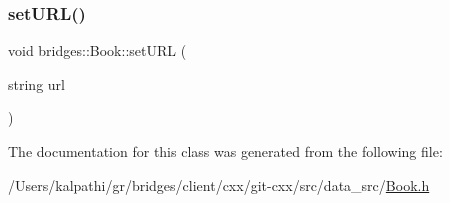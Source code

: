 \subsubsection{\texorpdfstring{set\+U\+R\+L()}{setURL()}}
{\footnotesize\ttfamily void bridges\+::\+Book\+::set\+U\+RL (\begin{DoxyParamCaption}\item[{string}]{url }\end{DoxyParamCaption})\hspace{0.3cm}{\ttfamily [inline]}}



The documentation for this class was generated from the following file\+:\begin{DoxyCompactItemize}
\item 
/\+Users/kalpathi/gr/bridges/client/cxx/git-\/cxx/src/data\+\_\+src/\hyperlink{_book_8h}{Book.\+h}\end{DoxyCompactItemize}
